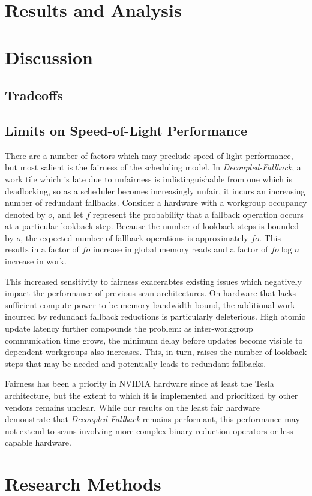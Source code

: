 \documentclass[sigconf]{acmart}
\begin{document}
\section{Results and Analysis}

\section{Discussion}

\subsection{Tradeoffs}

\subsection{Limits on Speed-of-Light Performance}
 There are a number of factors which may preclude speed-of-light performance, but most salient is the fairness of the scheduling model. In \emph{Decoupled-Fallback}, a work tile which is late due to unfairness is indistinguishable from one which is deadlocking, so as a scheduler becomes increasingly unfair, it incurs an increasing number of redundant fallbacks. Consider a hardware with a workgroup occupancy denoted by $o$, and let $f$ represent the probability that a fallback operation occurs at a particular lookback step. Because the number of lookback steps is bounded by $o$, the expected number of fallback operations is approximately $fo$. This results in a factor of $fo$ increase in global memory reads and a factor of $fo\log{n}$ increase in work.
 
 This increased sensitivity to fairness exacerabtes existing issues which negatively impact the performance of previous scan architectures. On hardware that lacks sufficient compute power to be memory-bandwidth bound, the additional work incurred by redundant fallback reductions is particularly deleterious. High atomic update latency further compounds the problem: as inter-workgroup communication time grows, the minimum delay before updates become visible to dependent workgroups also increases. This, in turn, raises the number of lookback steps that may be needed and potentially leads to redundant fallbacks.

 Fairness has been a priority in NVIDIA hardware since at least the Tesla architecture\cite{}, but the extent to which it is implemented and prioritized by other vendors remains unclear. While our results on the least fair hardware demonstrate that \emph{Decoupled-Fallback} remains performant, this performance may not extend to scans involving more complex binary reduction operators or less capable hardware.
\begin{acks}
\end{acks}




\appendix

\section{Research Methods}
\end{document}
